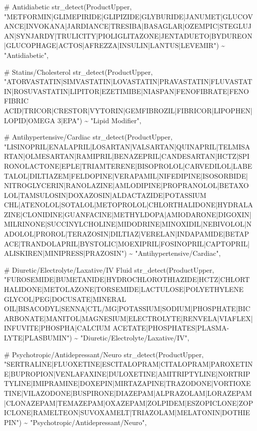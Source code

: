 \documentclass[
  letterpaper,
  DIV=11,
  numbers=noendperiod]{scrartcl}
\newenvironment{Shaded}{\begin{snugshade}}{\end{snugshade}}
\newcommand{\CommentTok}[1]{\textcolor[rgb]{0.37,0.37,0.37}{#1}}
\newcommand{\FunctionTok}[1]{\textcolor[rgb]{0.28,0.35,0.67}{#1}}
\newcommand{\NormalTok}[1]{\textcolor[rgb]{0.00,0.23,0.31}{#1}}
\newcommand{\SpecialCharTok}[1]{\textcolor[rgb]{0.37,0.37,0.37}{#1}}
\newcommand{\StringTok}[1]{\textcolor[rgb]{0.13,0.47,0.30}{#1}}
\begin{document}
\begin{Shaded}
\begin{Highlighting}[]
        \CommentTok{\# Antidiabetic}
        \FunctionTok{str\_detect}\NormalTok{(ProductUpper, }\StringTok{"METFORMIN|GLIMEPIRIDE|GLIPIZIDE|GLYBURIDE|JANUMET|GLUCOVANCE|INVOKANA|JARDIANCE|TRESIBA|BASAGLAR|OZEMPIC|STEGLUJAN|SYNJARDY|TRULICITY|PIOLIGLITAZONE|JENTADUETO|BYDUREON|GLUCOPHAGE|ACTOS|AFREZZA|INSULIN|LANTUS|LEVEMIR"}\NormalTok{) }\SpecialCharTok{\textasciitilde{}} \StringTok{"Antidiabetic"}\NormalTok{,}
  
        \CommentTok{\# Statins/Cholesterol}
        \FunctionTok{str\_detect}\NormalTok{(ProductUpper, }\StringTok{"ATORVASTATIN|SIMVASTATIN|LOVASTATIN|PRAVASTATIN|FLUVASTATIN|ROSUVASTATIN|LIPITOR|EZETIMIBE|NIASPAN|FENOFIBRATE|FENOFIBRIC ACID|TRICOR|CRESTOR|VYTORIN|GEMFIBROZIL|FIBRICOR|LIPOPHEN|LOPID|OMEGA 3|EPA"}\NormalTok{) }\SpecialCharTok{\textasciitilde{}} \StringTok{"Lipid Modifier"}\NormalTok{,}
  
        \CommentTok{\# Antihypertensive/Cardiac}
        \FunctionTok{str\_detect}\NormalTok{(ProductUpper, }\StringTok{"LISINOPRIL|ENALAPRIL|LOSARTAN|VALSARTAN|QUINAPRIL|TELMISARTAN|OLMESARTAN|RAMIPRIL|BENAZEPRIL|CANDESARTAN|HCTZ|SPIRONOLACTONE|EPLE|TRIAMTERENE|BISOPROLOL|CARVEDILOL|LABETALOL|DILTIAZEM|FELDOPINE|VERAPAMIL|NIFEDIPINE|ISOSORBIDE|NITROGLYCERIN|RANOLAZINE|AMLODIPINE|PROPRANOLOL|BETAXOLOL|TAMSULOSIN|DOXAZOSIN|ALDACTAZIDE|POTASSIUM CHL|ATENOLOL|SOTALOL|METOPROLOL|CHLORTHALIDONE|HYDRALAZINE|CLONIDINE|GUANFACINE|METHYLDOPA|AMIODARONE|DIGOXIN|MILRINONE|SUCCINYLCHOLINE|MIDODRINE|MINOXIDIL|NEBIVOLOL|NADOLOL|PROROL|TERAZOSIN|DILTIAZ|VERELAN|INDAPAMIDE|BETAPACE|TRANDOLAPRIL|BYSTOLIC|MOEXIPRIL|FOSINOPRIL|CAPTOPRIL|ALISKIREN|MINIPRESS|PRAZOSIN"}\NormalTok{) }\SpecialCharTok{\textasciitilde{}} \StringTok{"Antihypertensive/Cardiac"}\NormalTok{,}
  
        \CommentTok{\# Diuretic/Electrolyte/Laxative/IV Fluid}
        \FunctionTok{str\_detect}\NormalTok{(ProductUpper, }\StringTok{"FUROSEMIDE|BUMETANIDE|HYDROCHLOROTHIAZIDE|HCTZ|CHLORTHALIDONE|METOLAZONE|TORSEMIDE|LACTULOSE|POLYETHYLENE GLYCOL|PEG|DOCUSATE|MINERAL OIL|BISACODYL|SENNA|CTL/MG|POTASSIUM|SODIUM|PHOSPHATE|BICARBONATE|MANITOL|MAGNESIUM|ELECTROLYTE|RENVELA|VIAFLEX|INFUVITE|PHOSPHA|CALCIUM ACETATE|PHOSPHATES|PLASMA{-}LYTE|PLASBUMIN"}\NormalTok{) }\SpecialCharTok{\textasciitilde{}} \StringTok{"Diuretic/Electrolyte/Laxative/IV"}\NormalTok{,}
  
        \CommentTok{\# Psychotropic/Antidepressant/Neuro}
        \FunctionTok{str\_detect}\NormalTok{(ProductUpper, }\StringTok{"SERTRALINE|FLUOXETINE|ESCITALOPRAM|CITALOPRAM|PAROXETINE|BUPROPION|VENLAFAXINE|DULOXETINE|AMITRIPTYLINE|NORTRIPTYLINE|IMIPRAMINE|DOXEPIN|MIRTAZAPINE|TRAZODONE|VORTIOXETINE|VILAZODONE|BUSPIRONE|DIAZEPAM|ALPRAZOLAM|LORAZEPAM|CLONAZEPAM|TEMAZEPAM|OXAZEPAM|ZOLPIDEM|ESZOPICLONE|ZOPICLONE|RAMELTEON|SUVOXAMELT|TRIAZOLAM|MELATONIN|DOTHIEPIN"}\NormalTok{) }\SpecialCharTok{\textasciitilde{}} \StringTok{"Psychotropic/Antidepressant/Neuro"}\NormalTok{,}
  

\end{Highlighting}
\end{Shaded}
\end{document}
